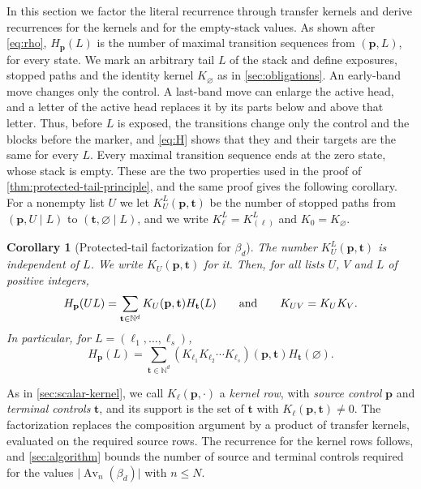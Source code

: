 \documentclass[11pt,reqno]{amsart}
\newtheorem{corollary}[corollary]{Corollary}
\theoremstyle{definition}
\theoremstyle{remark}
\newcommand{\Av}{\operatorname{Av}}
\newcommand{\N}{\mathbb N}
\begin{document}
In this section we factor the literal recurrence through transfer kernels and
derive recurrences for the kernels and for the empty-stack values.  As
shown after \eqref{eq:rho}, $H_{\mathbf p}(L)$ is the number of maximal
transition sequences from $(\mathbf p,L)$, for every state.  We mark an arbitrary tail $L$ of the stack
and define exposures, stopped paths and the identity kernel $K_\varnothing$
as in \cref{sec:obligations}.  An early-band move changes only the control.
A last-band move can enlarge the active head, and a letter of the active
head replaces it by its parts below and above that letter.  Thus,
before $L$ is exposed, the transitions change only the control and the
blocks before the marker, and \eqref{eq:H} shows that they and their targets
are the same for every $L$.  Every maximal transition sequence ends at the
zero state, whose stack is empty.  These are the two properties used in the
proof of \cref{thm:protected-tail-principle}, and the same proof gives the
following corollary.  For a nonempty list $U$ we let
$K_U^L(\mathbf p,\mathbf t)$ be the number of stopped paths from
$(\mathbf p,U\mid L)$ to $(\mathbf t,\varnothing\mid L)$, and we write
$K_\ell^L=K_{(\ell)}^L$ and $K_0=K_\varnothing$.

\begin{corollary}[Protected-tail factorization for $\beta_d$]\label{cor:protected-tail}
The number $K_U^L(\mathbf p,\mathbf t)$ is independent of $L$.  We write
$K_U(\mathbf p,\mathbf t)$ for it.  Then, for all lists $U$, $V$ and $L$ of
positive integers,
\begin{equation}\label{eq:factorization}
 H_{\mathbf p}(UL)=
 \sum_{\mathbf t\in\N^d}K_U(\mathbf p,\mathbf t)H_{\mathbf t}(L)
 \qquad\hbox{and}\qquad K_{UV}=K_UK_V.
\end{equation}
In particular, for $L=(\ell_1,\ldots,\ell_s)$,
\begin{equation}\label{eq:matrix-product}
 H_{\mathbf p}(L)=\sum_{\mathbf t\in\N^d}
 (K_{\ell_1}K_{\ell_2}\cdots K_{\ell_s})(\mathbf p,\mathbf t)
 H_{\mathbf t}(\varnothing).
\end{equation}
\end{corollary}

As in \cref{sec:scalar-kernel}, we call $K_\ell(\mathbf p,\mathord\cdot)$ a
\emph{kernel row}, with \emph{source control} $\mathbf p$ and
\emph{terminal controls} $\mathbf t$, and its support is the set of
$\mathbf t$ with $K_\ell(\mathbf p,\mathbf t)\ne0$.  The factorization
replaces the composition argument by a product of transfer kernels,
evaluated on the required source rows.  The recurrence for the kernel rows
follows, and \cref{sec:algorithm} bounds the number of source and terminal
controls required for the values $\lvert\Av_n(\beta_d)\rvert$ with $n\leq N$.
\end{document}
